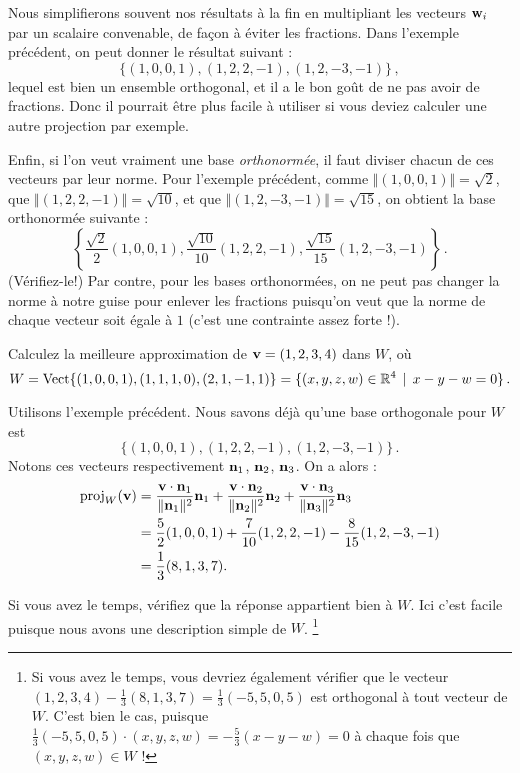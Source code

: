 \begin{myexample}
\begin{remark} Nous simplifierons souvent nos résultats à la fin en multipliant les vecteurs 
$\mathbf{w}_i$ par un scalaire convenable, de fa\c{c}on \`a éviter les fractions. Dans l'exemple pr\'ec\'edent, on peut donner le résultat suivant :
$$
\{ (1,0,0,1), (1,2,2,-1), (1,2,-3,-1)\}\,,
$$
lequel est bien un ensemble orthogonal, et il a le bon goût de ne pas avoir de fractions. Donc il
pourrait être
plus facile à utiliser si vous deviez calculer une autre projection par exemple.
\end{remark}

\medskip
Enfin, si l'on veut vraiment une base \emph{orthonormée}, il faut diviser chacun de ces vecteurs par leur norme.  Pour l'exemple pr\'ec\'edent, comme 
$
\Vert (1,0,0,1) \Vert = \sqrt{2}$,  que $\Vert  (1,2,2,-1) \Vert =   \sqrt{10}$, et que $ \Vert  (1,2,-3,-1) \Vert =   \sqrt{15} $, on obtient la base orthonormée suivante :
$$
\left\{ \frac{\sqrt{2}}{2}(1,0,0,1), \frac{\sqrt{10}}{ 10 }(1,2,2,-1), \frac{\sqrt{15}}{15}(1,2,-3,-1)\right\}\,.
$$
(V\'erifiez-le!) Par contre, pour les bases orthonormées, on ne peut pas changer la norme à notre guise pour enlever les fractions puisqu'on veut que la norme de chaque vecteur soit égale à $1$ (c'est une contrainte assez forte !).
\end{myexample}



\begin{myexample}\label{Wagain} Calculez la meilleure approximation de $\mathbf{v} = (1,2,3,4)$ dans $W$, où
$$
W = \textrm{Vect}\{(1,0,0,1), (1,1,1,0), (2,1,-1,1)\}=\{(x,y,z,w)\in \mathbb{R}^4\, \mid \, x - y - w = 0\}\,.
$$

Utilisons l'exemple précédent.  Nous savons déjà qu'une
base orthogonale pour $W$ est 
$$
\{  (1,0,0,1),  (1,2,2,-1),  (1,2,-3,-1)\}\,.
$$
Notons ces vecteurs respectivement $\mathbf{n}_1$, $\mathbf{n}_2$, $\mathbf{n}_3$.
On a alors :
\begin{align*}
\operatorname{proj}_W(\mathbf{v}) &= \frac{\mathbf{v}\cdot\mathbf{n}_1}{\|\mathbf{n}_1\|^2} \mathbf{n}_1 +  \frac{\mathbf{v}\cdot\mathbf{n}_2}{\|\mathbf{n}_2\|^2} \mathbf{n}_2 + \frac{\mathbf{v}\cdot\mathbf{n}_3}{\|\mathbf{n}_3\|^2} \mathbf{n}_3 \\  
&= \frac{5}{2}  (1,0,0,1) + \frac{7}{10} (1,2,2,-1)  -\frac{8}{15}(1,2,-3,-1)\\
&=  \frac{1}{3}(8,1,3,7).
\end{align*}

Si vous avez le temps, vérifiez que la réponse appartient bien à $W$. Ici c'est facile puisque nous avons une description simple de $W$. \footnote{ Si vous avez le temps, vous devriez également vérifier que le vecteur $(1,2,3,4)-\frac{1}{3}(8,1,3,7)=\frac13(-5,5,0,5)$ est orthogonal à tout vecteur de $W$. C'est bien le cas, puisque $\frac13(-5,5,0,5)\cdot (x,y,z,w)=-\frac53 (x-y-w)=0 $ \`a chaque fois que $(x,y,z,w)\in W$ ! }
\end{myexample}


